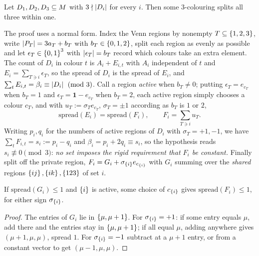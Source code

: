\begin{theorem}
\label{thm:f5-Qproved}
Let $D_1,D_2,D_3 \subseteq M$ with $3 \nmid \left\lvert D_i\right\rvert$ for every $i$. Then
some $3$-colouring splits all three within one.
\end{theorem}

The proof uses a normal form. Index the Venn regions by nonempty
$T \subseteq \left\{1,2,3\right\}$, write $\left\lvert P_T\right\rvert = 3a_T + b_T$ with
$b_T \in \left\{0,1,2\right\}$, split each region as evenly as possible and let
$\epsilon_T \in \left\{0,1\right\}^3$ with $\left\lvert\epsilon_T\right\rvert = b_T$ record which colours
take an extra element. The count of $D_i$ in colour $t$ is $A_i + E_{i,t}$ with
$A_i$ independent of $t$ and $E_i = \sum_{T \ni i}\epsilon_T$, so the spread of
$D_i$ is the spread of $E_i$, and $\sum_t E_{i,t} = \beta_i \equiv \left\lvert D_i\right\rvert
\pmod 3$. Call a region \emph{active} when $b_T \ne 0$; putting
$\epsilon_T = e_{c_T}$ when $b_T = 1$ and $\epsilon_T = \mathbf 1 - e_{c_T}$ when
$b_T = 2$, each active region simply chooses a colour $c_T$, and with
$u_T := \sigma_T e_{c_T}$, $\sigma_T = \pm 1$ according as $b_T$ is $1$ or $2$,
\[
  \mathrm{spread}(E_i) = \mathrm{spread}(F_i), \qquad F_i = \sum_{T \ni i} u_T .
\]
Writing $p_i, q_i$ for the numbers of active regions of $D_i$ with
$\sigma_T = +1, -1$, we have $\sum_t F_{i,t} = s_i := p_i - q_i$ and
$\beta_i = p_i + 2q_i \equiv s_i$, so the hypothesis reads
$s_i \not\equiv 0 \pmod 3$: \emph{no set imposes the rigid requirement that
$F_i$ be constant.} Finally split off the private region,
$F_i = G_i + \sigma_{\left\{i\right\}} e_{c_{\left\{i\right\}}}$ with $G_i$ summing over the
\emph{shared} regions $\left\{ij\right\},\left\{ik\right\},\left\{123\right\}$ of set $i$.

\begin{lemma}
\label{lem:f5-knob}
If $\mathrm{spread}(G_i) \le 1$ and $\left\{i\right\}$ is active, some choice of
$c_{\left\{i\right\}}$ gives $\mathrm{spread}(F_i) \le 1$, for either sign
$\sigma_{\left\{i\right\}}$.
\end{lemma}

\begin{proof}
The entries of $G_i$ lie in $\left\{\mu,\mu+1\right\}$. For $\sigma_{\left\{i\right\}} = +1$: if
some entry equals $\mu$, add there and the entries stay in $\left\{\mu,\mu+1\right\}$; if
all equal $\mu$, adding anywhere gives $(\mu+1,\mu,\mu)$, spread $1$. For
$\sigma_{\left\{i\right\}} = -1$ subtract at a $\mu+1$ entry, or from a constant vector to
get $(\mu-1,\mu,\mu)$.
\end{proof}


